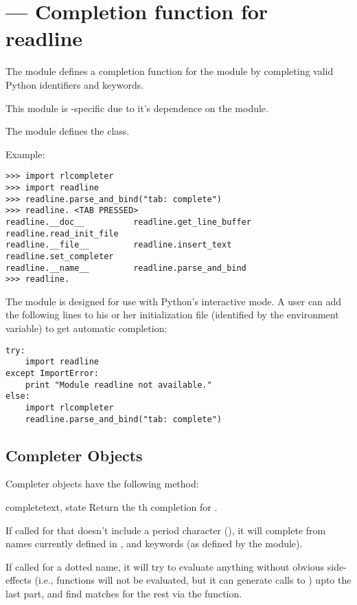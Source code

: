 \section{ ---
         Completion function for readline}


The  module defines a completion function for
the  module by completing valid Python identifiers
and keywords.

This module is \UNIX-specific due to it's dependence on the
 module.

The  module defines the  class.

Example:

\begin{verbatim}
>>> import rlcompleter
>>> import readline
>>> readline.parse_and_bind("tab: complete")
>>> readline. <TAB PRESSED>
readline.__doc__          readline.get_line_buffer  readline.read_init_file
readline.__file__         readline.insert_text      readline.set_completer
readline.__name__         readline.parse_and_bind
>>> readline.
\end{verbatim}

The  module is designed for use with Python's
interactive mode.  A user can add the following lines to his or her
initialization file (identified by the 
environment variable) to get automatic  completion:

\begin{verbatim}
try:
    import readline
except ImportError:
    print "Module readline not available."
else:
    import rlcompleter
    readline.parse_and_bind("tab: complete")
\end{verbatim}


\subsection{Completer Objects \label{completer-objects}}

Completer objects have the following method:

\begin{methoddesc}[Completer]{complete}{text, state}
Return the th completion for .

If called for  that doesn't include a period character
(), it will complete from names currently defined in
,  and
keywords (as defined by the  module).

If called for a dotted name, it will try to evaluate anything without
obvious side-effects (i.e., functions will not be evaluated, but it
can generate calls to ) upto the last part, and
find matches for the rest via the  function.
\end{methoddesc}
